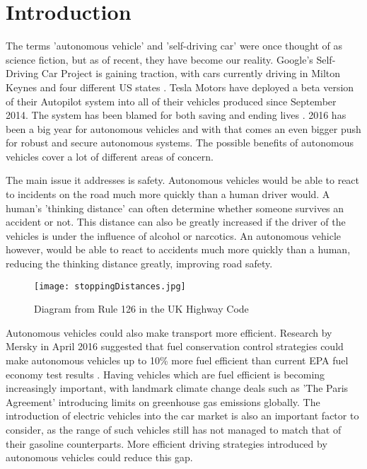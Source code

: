 \chapter{Introduction}
\label{cha:Introduction}

The terms 'autonomous vehicle' and 'self-driving car' were once thought of as science fiction, but as of recent, they have become our reality. Google's Self-Driving Car Project is gaining traction, with cars currently driving in Milton Keynes and four different US states \citep{GoogleCars}. Tesla Motors have deployed a beta version of their Autopilot system into all of their vehicles produced since September 2014. The system has been blamed for both saving and ending lives \citep{TeslaHospital} \citep{TeslaUnderInvestigation}. 2016 has been a big year for autonomous vehicles and with that comes an even bigger push for robust and secure autonomous systems.
The possible benefits of autonomous vehicles cover a lot of different areas of concern. 

The main issue it addresses is safety. Autonomous vehicles would be able to react to incidents on the road much more quickly than a human driver would. A human's 'thinking distance' can often determine whether someone survives an accident or not. This distance can also be greatly increased if the driver of the vehicles is under the influence of alcohol or narcotics. An autonomous vehicle however, would be able to react to accidents much more quickly than a human, reducing the thinking distance greatly, improving road safety.

\begin{figure}[htb]
\texttt{[image: stoppingDistances.jpg]}
\caption{Diagram from Rule 126 in the UK Highway Code \citep{StoppingDistances}}
\end{figure}

Autonomous vehicles could also make transport more efficient. Research by Mersky in April 2016 suggested that fuel conservation control strategies could make autonomous vehicles up to 10\% more fuel efficient than current EPA fuel economy test results \citep{Mersky2016} . Having vehicles which are fuel efficient is becoming increasingly important, with landmark climate change deals such as 'The Paris Agreement' introducing limits on greenhouse gas emissions globally. The introduction of electric vehicles into the car market is also an important factor to consider, as the range of such vehicles still has not managed to match that of their gasoline counterparts. More efficient driving strategies introduced by autonomous vehicles could reduce this gap.

